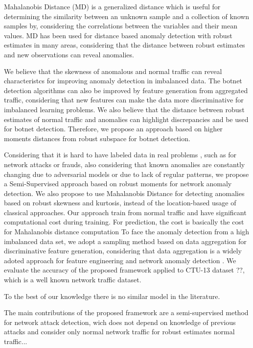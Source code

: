 \documentclass[review]{elsarticle}
\begin{document}
Mahalanobis Distance (MD) is a generalized distance which is useful for determining the similarity between an unknown sample and a collection of known samples by, considering the correlations between the variables and their mean values. MD has been used for distance based anomaly detection with robust estimates in many areas, considering that the distance between robust estimates and new observations can reveal anomalies.

We believe that the skewness of anomalous and normal traffic can reveal characteristcs for improving anomaly detection in imbalanced data. The botnet detection algorithms can also be improved by feature generation from aggregated traffic, considering that new features can make the data more discriminative for imbalanced learning problems. We also believe that the distance between robust estimates of normal traffic and anomalies can highlight discrepancies and be used for botnet detection. Therefore, we propose an approach based on higher moments distances from robust subspace for botnet detection. 

Considering that it is hard to have labeled data in real problems \cite{osanaiye2016distributed}, such as for network attacks or frauds, also considering that known anomalies are constantly changing due to adversarial models or due to lack of regular patterns, we propose a Semi-Supervised approach based on robust moments for network anomaly detection. We also propose to use Mahalanobis Distance for detecting anomalies based on robust skewness and kurtosis, instead of the location-based usage of classical approaches. Our approach train from normal traffic and have significant computational cost during training. For prediction, the cost is basically the cost for Mahalanobis distance computation To face the anomaly detection from a high imbalanced data set, we adopt a sampling method based on data aggregation for discriminative feature generation, considering that data aggregation is a widely adoted approach for feature engineering \cite{garcia2014empirical, chandrashekar2014survey,acarali2016survey} and network anomaly detection \cite{lakhina2005mining, callegari2011novel, vieira2017model}. We evaluate the accuracy of the proposed framework applied to CTU-13 dataset ??, which is a well known network traffic dataset.




To the best of our knowledge there is no similar model in the literature. 


The main contributions of the proposed framework are a semi-supervised method for network attack detection, wich does not depend on knowledge of previous attacks and consider only normal network traffic for robust estimates normal traffic...
\end{document}

